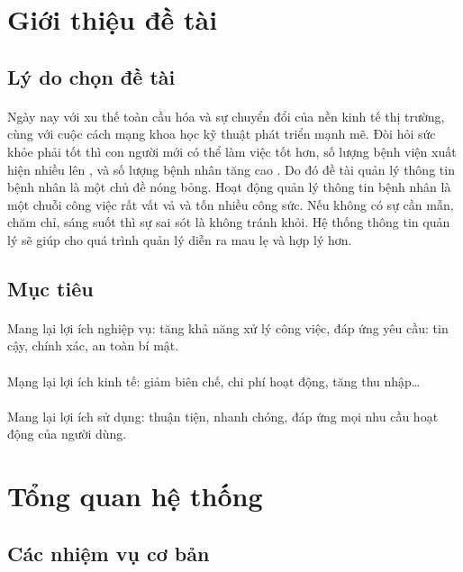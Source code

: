 \documentclass{report}
\begin{document}
\section{Giới thiệu đề tài}
\fontsize{13}{15}\selectfont
\subsection{Lý do chọn đề tài}
\paragraph{}
Ngày nay với xu thế toàn cầu hóa và sự chuyển đổi của nền kinh tế thị trường, cùng với cuộc cách mạng khoa học kỹ thuật phát triển mạnh mẽ. Đòi hỏi sức khỏe phải tốt thì con người mới có thể làm việc tốt hơn, số lượng bệnh viện xuất hiện nhiều lên , và số lượng bệnh nhân tăng cao . Do đó đề tài quản lý thông tin bệnh nhân là một chủ đề nóng bỏng. Hoạt động quản lý thông tin bệnh nhân là một chuỗi công việc rất vất vả và tốn nhiều công sức. Nếu không có sự cần mẫn, chăm chỉ, sáng suốt thì sự sai sót là không tránh khỏi. Hệ thống thông tin quản lý sẽ giúp cho quá trình quản lý diễn ra mau lẹ và hợp lý hơn.
\subsection{Mục tiêu}
\fontsize{13}{15}\selectfont
\paragraph{}
Mang lại lợi ích nghiệp vụ: tăng khả năng xử lý công việc, đáp ứng yêu cầu: tin cậy, chính xác, an toàn bí mật.
\paragraph{}
Mạng lại lợi ích kinh tế: giảm biên chế, chi phí hoạt động, tăng thu nhập…
\paragraph{}
Mang lại lợi ích sử dụng: thuận tiện, nhanh chóng, đáp ứng mọi nhu cầu hoạt động của người dùng.
\section{Tổng quan hệ thống}
\fontsize{13}{15}\selectfont
\subsection{Các nhiệm vụ cơ bản}
\end{document}
